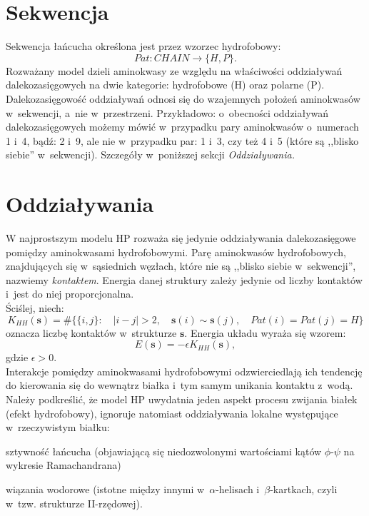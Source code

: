 \documentclass[a4paper,11pt,twoside]{book}
\newenvironment{packed_enum}{
\begin{enumerate}
  \setlength{\itemsep}{1pt}
  \setlength{\parskip}{0pt}
  \setlength{\parsep}{0pt}
}{\end{enumerate}}
\begin{document}
\section{Sekwencja}
Sekwencja łańcucha określona jest przez wzorzec hydrofobowy:
\begin{displaymath}
Pat \colon CHAIN \to \{ H, P \}.
\end{displaymath}
Rozważany model dzieli aminokwasy ze względu na właściwości oddziaływań dalekozasięgowych na dwie kategorie: hydrofobowe (H) oraz polarne (P). Dalekozasięgowość oddziaływań odnosi się do wzajemnych położeń aminokwasów w~sekwencji, a~nie w~przestrzeni. Przykładowo: o~obecności oddziaływań dalekozasięgowych możemy mówić w~przypadku pary aminokwasów o~numerach 1 i~4, bądź: 2 i~9, ale nie w~przypadku par: 1 i~3, czy też 4 i~5 (które są ,,blisko siebie'' w~sekwencji). Szczegóły w~poniższej sekcji \emph{Oddziaływania.}
\section{Oddziaływania}
W najprostszym modelu HP rozważa się jedynie oddziaływania dalekozasięgowe pomiędzy aminokwasami hydrofobowymi. Parę aminokwasów hydrofobowych, znajdujących się w~sąsiednich węzłach, które nie są ,,blisko siebie w~sekwencji'', nazwiemy \emph{kontaktem}. Energia danej struktury zależy jedynie od liczby kontaktów i~jest do niej proporcjonalna.\\

Ściślej, niech:
\begin{displaymath}
K_{HH}(\mathbf{s}) = \# \{ \{ i,j \} : \quad |i-j|>2, \quad \mathbf{s}(i) \sim \mathbf{s}(j), \quad Pat(i)=Pat(j)=H\}
\end{displaymath}
oznacza liczbę kontaktów w~strukturze $\mathbf{s}$. Energia układu wyraża się wzorem:
\begin{displaymath}
E(\mathbf{s}) = -\epsilon K_{HH}(\mathbf{s}),
\end{displaymath}
gdzie $\epsilon>0$.\\

Interakcje pomiędzy aminokwasami hydrofobowymi odzwierciedlają ich tendencję do kierowania się do wewnątrz białka i~tym samym unikania kontaktu z~wodą. Należy podkreślić, że model HP uwydatnia jeden aspekt procesu zwijania białek (efekt hydrofobowy), ignoruje natomiast oddziaływania lokalne występujące w~rzeczywistym białku:
\begin{packed_enum}
\item sztywność łańcucha (objawiającą się niedozwolonymi wartościami kątów $\phi$-$\psi$ na wykresie Ramachandrana)
\item wiązania wodorowe (istotne między innymi w~$\alpha$-helisach i~$\beta$-kartkach, czyli w~tzw. strukturze II-rzędowej).
\end{packed_enum}
\end{document}

